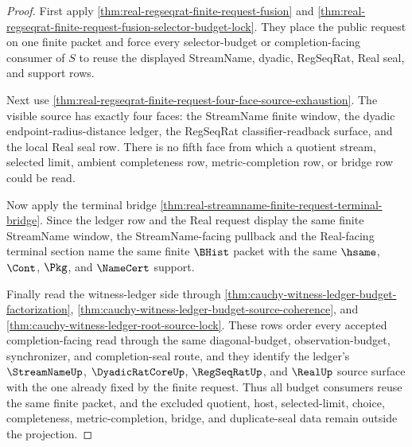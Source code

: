 \begin{proof}
First apply \autoref{thm:real-regseqrat-finite-request-fusion} and \autoref{thm:real-regseqrat-finite-request-fusion-selector-budget-lock}. They place the public request on one finite packet and force every selector-budget or completion-facing consumer of $S$ to reuse the displayed StreamName, dyadic, RegSeqRat, Real seal, and support rows.

Next use \autoref{thm:real-regseqrat-finite-request-four-face-source-exhaustion}. The visible source has exactly four faces: the StreamName finite window, the dyadic endpoint-radius-distance ledger, the RegSeqRat classifier-readback surface, and the local Real seal row. There is no fifth face from which a quotient stream, selected limit, ambient completeness row, metric-completion row, or bridge row could be read.

Now apply the terminal bridge \autoref{thm:real-streamname-finite-request-terminal-bridge}. Since the ledger row and the Real request display the same finite StreamName window, the StreamName-facing pullback and the Real-facing terminal section name the same finite $\BHist$ packet with the same $\hsame$, $\Cont$, $\Pkg$, and $\NameCert$ support.

Finally read the witness-ledger side through \autoref{thm:cauchy-witness-ledger-budget-factorization}, \autoref{thm:cauchy-witness-ledger-budget-source-coherence}, and \autoref{thm:cauchy-witness-ledger-root-source-lock}. These rows order every accepted completion-facing read through the same diagonal-budget, observation-budget, synchronizer, and completion-seal route, and they identify the ledger's $\StreamNameUp$, $\DyadicRatCoreUp$, $\RegSeqRatUp$, and $\RealUp$ source surface with the one already fixed by the finite request. Thus all budget consumers reuse the same finite packet, and the excluded quotient, host, selected-limit, choice, completeness, metric-completion, bridge, and duplicate-seal data remain outside the projection.
\end{proof}


